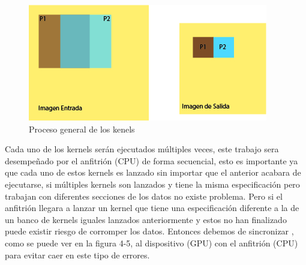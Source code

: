 \begin{figure}[h]
			\centering
				\includegraphics[scale=1]{img/prosImg.jpg}
			\caption{Proceso general de los kenels }
\end{figure}


Cada uno de los kernels serán ejecutados múltiples veces, este trabajo sera desempeñado por el anfitrión (CPU) de forma secuencial, esto es importante ya que cada uno de estos kernels es lanzado sin importar que el anterior acabara de ejecutarse, si múltiples kernels son lanzados y tiene la misma especificación pero trabajan con diferentes secciones de los datos no existe problema. Pero si el anfitrión llegara a lanzar un kernel que tiene una especificación diferente a la de un banco de kernels iguales lanzados anteriormente y estos no han finalizado puede existir riesgo de corromper los datos. Entonces debemos de sincronizar , como se puede ver en la figura 4-5, al  dispositivo (GPU) con el anfitrión (CPU) para evitar caer en este tipo de errores.

